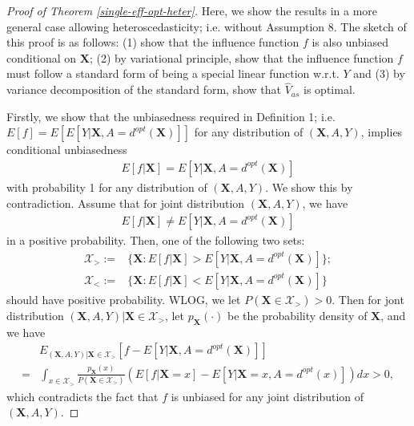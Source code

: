 \documentclass[11pt]{article}
\theoremstyle{referenceplain}
\theoremstyle{referencedefinition}
\theoremstyle{referenceremark}
\begin{document}
\begin{proof}[Proof of Theorem \ref{single-eff-opt-heter}]
Here, we show the results in a more general case allowing heteroscedasticity; i.e. without Assumption 8. The sketch of this proof is as follows: (1) show that the influence function $f$ is also unbiased conditional on $\mathbf{X}$; (2) by variational principle, show that the influence function $f$ must follow a standard form of being a special linear function w.r.t. $Y$ and (3) by variance decomposition of the standard form, show that $\widehat{V}_{as}$ is optimal.


Firstly, we show that the unbiasedness required in Definition 1; i.e. $E[f] = E[E[Y|\mathbf{X},A=d^{opt}(\mathbf{X})]]$ for any distribution of $(\mathbf{X},A,Y)$, implies conditional unbiasedness 
    \begin{align*}
        E[f|\mathbf{X}] = E[Y|\mathbf{X},A=d^{opt}(\mathbf{X})]
    \end{align*}
    with probability 1 for any distribution of $(\mathbf{X},A,Y)$. We show this by contradiction. Assume that for joint distribution $(\mathbf{X},A,Y)$, we have
    \begin{align*}
          E[f|\mathbf{X}] \neq E[Y|\mathbf{X},A=d^{opt}(\mathbf{X})]
    \end{align*}
    in a positive probability. Then, one of the following two sets:
    \begin{align*}
        \mathcal{X}_>:=&\{\mathbf{X}: E[f|\mathbf{X}] > E[Y|\mathbf{X},A=d^{opt}(\mathbf{X})]\};\\
         \mathcal{X}_<:=&\{\mathbf{X}: E[f|\mathbf{X}] < E[Y|\mathbf{X},A=d^{opt}(\mathbf{X})]\}
    \end{align*}
    should have positive probability. WLOG, we let $P(\mathbf{X}\in\mathcal{X}_>)>0$. Then for jont distribution $(\mathbf{X},A,Y)|\mathbf{X}\in\mathcal{X}_>$, let $p_{\mathbf{X}}(\cdot)$ be the probability density of $\mathbf{X}$, and we have
    \begin{align*}
        &E_{(\mathbf{X},A,Y)|\mathbf{X}\in\mathcal{X}_>}[f-E[Y|\mathbf{X},A=d^{opt}(\mathbf{X})]]\\
        =&\int_{x\in\mathcal{X}_>}\frac{p_{\mathbf{X}}(x)}{P(\mathbf{X}\in\mathcal{X}_>)}\left( E[f|\mathbf{X}=x] - E[Y|\mathbf{X}=x,A=d^{opt}(x)]\right) dx>0,
    \end{align*}
    which contradicts the fact that $f$ is unbiased for any joint distribution of $(\mathbf{X},A,Y)$.


\end{proof}
\end{document}
